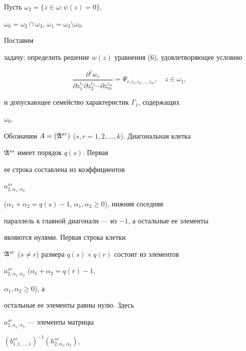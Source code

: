 Пусть $\omega_2=\{z\in\omega:\psi(z)=0\}$,


$\omega_0=\omega_2\cap\omega_3$, $\omega_1=\omega_3\setminus\omega_0$.


Поставим


задачу: определить решение $w(z)$ уравнения (6), удовлетворяющее условию


\begin{equation}


\frac{\partial^j w_r}{\partial z^{i_1}_1\partial z^{i_2}_2


\dotsb\partial z^{i_m}_m}=


\Psi_{r,i_1,i_2,\dotsc,i_m},\quad z\in\omega_1,


\end{equation}


и допускающее семейство характеристик $\Gamma_1$, содержащих


$\omega_0$.





Обозначим $A=(\frak A^{sr})$ ($s,r=1,2,\dotsc,k$). Диагональная клетка


$\frak A^{ss}$ имеет порядок $q(s)$. Первая


ее строка составлена из коэффициентов


$a^{ss}_{2,\alpha_1,\alpha_2}$


($\alpha_1+\alpha_2=q(s)-1$, $\alpha_1,\alpha_2\ge 0$), нижняя соседняя


параллель к главной диагонали --- из $-1$, а остальные ее элементы


являются нулями. Первая строка клетки


$\frak A^{sr}$ ($s\ne r$) размера $q(s)\times q(r)$ состоит из элементов


$a^{sr}_{2,\alpha_1,\alpha_2}$ ($\alpha_1+\alpha_2=q(r)-1$,


$\alpha_1,\alpha_2\ge 0$), а


остальные ее элементы равны нулю. Здесь


$a^{sr}_{2,\alpha_1,\alpha_2}$ --- элементы матрицы


$(b^{sr}_{1,1,\dotsc,1})^{-1}(h^{sr}_{2,\alpha_1,\alpha_2})$,


